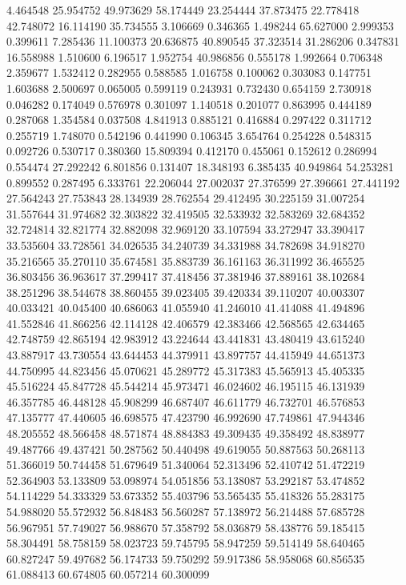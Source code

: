 4.464548
25.954752
49.973629
58.174449
23.254444
37.873475
22.778418
42.748072
16.114190
35.734555
3.106669
0.346365
1.498244
65.627000
2.999353
0.399611
7.285436
11.100373
20.636875
40.890545
37.323514
31.286206
0.347831
16.558988
1.510600
6.196517
1.952754
40.986856
0.555178
1.992664
0.706348
2.359677
1.532412
0.282955
0.588585
1.016758
0.100062
0.303083
0.147751
1.603688
2.500697
0.065005
0.599119
0.243931
0.732430
0.654159
2.730918
0.046282
0.174049
0.576978
0.301097
1.140518
0.201077
0.863995
0.444189
0.287068
1.354584
0.037508
4.841913
0.885121
0.416884
0.297422
0.311712
0.255719
1.748070
0.542196
0.441990
0.106345
3.654764
0.254228
0.548315
0.092726
0.530717
0.380360
15.809394
0.412170
0.455061
0.152612
0.286994
0.554474
27.292242
6.801856
0.131407
18.348193
6.385435
40.949864
54.253281
0.899552
0.287495
6.333761
22.206044
27.002037
27.376599
27.396661
27.441192
27.564243
27.753843
28.134939
28.762554
29.412495
30.225159
31.007254
31.557644
31.974682
32.303822
32.419505
32.533932
32.583269
32.684352
32.724814
32.821774
32.882098
32.969120
33.107594
33.272947
33.390417
33.535604
33.728561
34.026535
34.240739
34.331988
34.782698
34.918270
35.216565
35.270110
35.674581
35.883739
36.161163
36.311992
36.465525
36.803456
36.963617
37.299417
37.418456
37.381946
37.889161
38.102684
38.251296
38.544678
38.860455
39.023405
39.420334
39.110207
40.003307
40.033421
40.045400
40.686063
41.055940
41.246010
41.414088
41.494896
41.552846
41.866256
42.114128
42.406579
42.383466
42.568565
42.634465
42.748759
42.865194
42.983912
43.224644
43.441831
43.480419
43.615240
43.887917
43.730554
43.644453
44.379911
43.897757
44.415949
44.651373
44.750995
44.823456
45.070621
45.289772
45.317383
45.565913
45.405335
45.516224
45.847728
45.544214
45.973471
46.024602
46.195115
46.131939
46.357785
46.448128
45.908299
46.687407
46.611779
46.732701
46.576853
47.135777
47.440605
46.698575
47.423790
46.992690
47.749861
47.944346
48.205552
48.566458
48.571874
48.884383
49.309435
49.358492
48.838977
49.487766
49.437421
50.287562
50.440498
49.619055
50.887563
50.268113
51.366019
50.744458
51.679649
51.340064
52.313496
52.410742
51.472219
52.364903
53.133809
53.098974
54.051856
53.138087
53.292187
53.474852
54.114229
54.333329
53.673352
55.403796
53.565435
55.418326
55.283175
54.988020
55.572932
56.848483
56.560287
57.138972
56.214488
57.685728
56.967951
57.749027
56.988670
57.358792
58.036879
58.438776
59.185415
58.304491
58.758159
58.023723
59.745795
58.947259
59.514149
58.640465
60.827247
59.497682
56.174733
59.750292
59.917386
58.958068
60.856535
61.088413
60.674805
60.057214
60.300099
